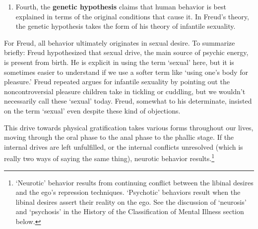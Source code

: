 \begin{refsection}
\begin{enumerate}
\item Fourth, the \textbf{genetic hypothesis} claims that human behavior is best explained in terms of the original conditions that cause it. In Freud's theory, the genetic hypothesis takes the form of his theory of infantile sexuality.

\end{enumerate}

For Freud, all behavior ultimately originates in sexual desire. To summarize briefly: Freud hypothesized that sexual drive, the main source of psychic energy, is present from birth. He is explicit in using the term `sexual' here, but it is sometimes easier to understand if we use a softer term like `using one's body for pleasure.' Freud repeated argues for infantile sexuality by pointing out the noncontroversial pleasure children take in tickling or cuddling, but we wouldn't necessarily call these `sexual' today. Freud, somewhat to his determinate, insisted on the term `sexual' even despite these kind of objections.

This drive towards physical gratification takes various forms throughout our lives, moving through the oral phase to the anal phase to the phallic stage. If the internal drives are left unfulfilled, or the internal conflicts unresolved (which is really two ways of saying the same thing), neurotic behavior results.\footnote{`Neurotic' behavior results from continuing conflict between the libinal desires and the ego's repression techniques. `Psychotic' behaviors result when the libinal desires assert their reality on the ego. See the discussion of `neurosis' and `psychosis' in the History of the Classification of Mental Illness section below.}


\end{refsection}
